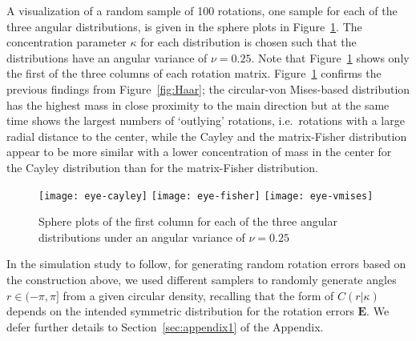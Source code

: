 A visualization of a random sample of 100 rotations, one sample for each of the three angular distributions, is given in the sphere plots in Figure~\ref{eyeballs}. The concentration parameter $\kappa$ for each distribution is chosen such that the distributions have an angular variance of $\nu = 0.25$. Note that Figure~\ref{eyeballs} shows only the first of the three columns of each rotation matrix. %
Figure~\ref{eyeballs}  confirms the previous findings from Figure~\ref{fig:Haar}; the circular-von Mises-based distribution has the highest mass in close proximity to the main direction but at the same time shows the largest numbers of `outlying' rotations, i.e.~rotations with a large radial distance to the center, while the Cayley and the matrix-Fisher distribution appear to be more similar with a lower concentration of mass in the center for the Cayley distribution than for the matrix-Fisher distribution. 

\begin{figure}[htbp]
\texttt{[image: eye-cayley]}
\texttt{[image: eye-fisher]}
\texttt{[image: eye-vmises]}
\caption{\label{eyeballs}Sphere plots of the first column for each of the three angular distributions under an angular variance of  $\nu = 0.25$}
\end{figure}



\noindent In the simulation study to follow, for generating random rotation errors based on the construction above, we used different samplers to randomly generate angles $r\in(-\pi,\pi]$ from a given circular density, recalling that the form of $C(r|\kappa)$ depends on the intended symmetric distribution for the rotation errors $\bm{E}$.  We defer further details to Section~\ref{sec:appendix1} of the Appendix.



